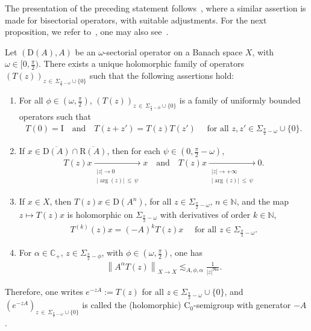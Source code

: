 \documentclass[10pt]{amsart}
\theoremstyle{definition}\newtheorem{defi}[theo]{Definition}\newtheorem{rema}[theo]{Remark}\newtheorem{exam}[theo]{Example}\newtheorem{exem}[theo]{Example}\newtheorem{nota}[theo]{Notation}
\newcommand{\bbC}{\mathbb{C}}
\newcommand{\bbN}{\mathbb{N}}
\newcommand{\rmD}{\mathrm{D}}
\newcommand{\rmC}{\mathrm{C}}
\newcommand{\rmR}{\mathrm{R}}
\newcommand{\rmI}{\mathrm{I}}
\begin{document}
The presentation of the preceding statement follows~\cite[Proposition~3.2.2]{EgertPhDThesis2015}, where a similar assertion is made for bisectorial operators, with suitable adjustments. For the next proposition, we refer to~\cite[Proposition~3.4.1]{bookHaase2006}, one may also see~\cite[Proposition~3.7.2,~Theorem~3.7.11]{ArendtBattyHieberNeubranker2011}.

\begin{prop}\label{prop:holoSemigrp}
Let $(\rmD(A),A)$ be an $\omega$-sectorial operator on a Banach space $X$, with $\omega\in[0,\frac{\pi}{2})$. There exists a unique holomorphic family of operators $(T(z))_{z\,\in\,\Sigma_{\frac{\pi}{2}-\omega}\cup\{0\}}$ such that the following assertions hold:
\begin{enumerate}
\item\label{prop1.5.1} For all $\phi\in(\omega,\frac{\pi}{2})$, $(T(z))_{z\,\in\,\Sigma_{\frac{\pi}{2}-\phi}\cup\{0\}}$ is a family of uniformly bounded operators such that
\begin{align*}
T(0)=\rmI \quad\text{and}\quad T(z+z')=T(z)T(z')\quad\text{ for all } z,z'\in\Sigma_{\frac{\pi}{2}-\omega}\cup\{0\}.
\end{align*}
\item\label{prop1.5.2} If $x\in\overline{\rmD(A)}\cap \overline{\rmR(A)}$, then for each $\psi\in(0,\frac{\pi}{2}-\omega)$,
\begin{align*}
T(z)x \xrightarrow[\substack{| z|\rightarrow 0\\
|\arg(z)| \,\leqslant\,\psi}]{} x \quad\text{and}\quad T(z)x \xrightarrow[\substack{| z|\rightarrow +\infty\\
|\arg(z)|\,\leqslant\,\psi}]{} 0 .
\end{align*}
\item\label{prop1.5.3} If $x\in X$, then $T(z)x\in\rmD(A^n)$, for all $z\in\Sigma_{\frac{\pi}{2}-\omega}$, $n\in\bbN $, and the map $z\longmapsto T(z)x$ is holomorphic on $\Sigma_{\frac{\pi}{2}-\omega}$ with derivatives of order $k\in\bbN $,
\begin{align*}
T^{(k)}(z)x = (-A)^kT(z)x\quad\text{ for all } z\in\Sigma_{\frac{\pi}{2}-\omega}.
\end{align*}
\item\label{prop1.5.4} For $\alpha\in\bbC_+$, $z\in\Sigma_{\frac{\pi}{2}-\phi}$, with $\phi\in(\omega,\frac{\pi}{2})$, one has
\begin{align*}
\left\| A^{\alpha}T(z)\right\|_{X\rightarrow X} \lesssim_{A,\phi,\alpha} \frac{1}{| z|^{\Re\alpha}}.
\end{align*}
\end{enumerate}
Therefore, one writes $e^{-zA}:=T(z)$ for all $z\in\Sigma_{\frac{\pi}{2}-\omega}\cup\{0\}$, and $(e^{-zA})_{z\,\in\,\Sigma_{\frac{\pi}{2}-\omega}\cup\{0\}}$ is called the (holomorphic) $\rmC _0$-semigroup with generator $-A$.
\end{prop}
\end{document}
